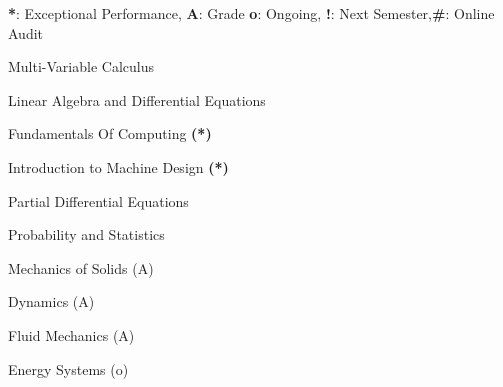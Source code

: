 
\begin{cventries}

  \cventry
    {\textbf{*}: Exceptional Performance, \textbf{A}: Grade  \textbf{o}: Ongoing,   \textbf{!}: Next Semester,\textbf{\#}: Online Audit}{}{}{}
    {
      \begin{cvitems}
        \item {Multi-Variable Calculus}
        \item {Linear Algebra and Differential Equations}
        \item {Fundamentals Of Computing \textbf{(*)}}
        \item {Introduction to Machine Design \textbf{(*)}} 
        \item {Partial Differential Equations}
        \item {Probability and Statistics}
        \item {Mechanics of Solids (A)}
        \item {Dynamics (A)}
        \item {Fluid Mechanics (A)}
        \item {Energy Systems (o)}
      \end{cvitems}
      }
  \end{cventries}
